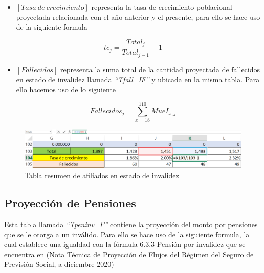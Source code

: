 \documentclass[
  letterpaper,
  DIV=11,
  numbers=noendperiod]{scrreprt}
\providecommand{\tightlist}{%
  \setlength{\itemsep}{0pt}\setlength{\parskip}{0pt}}\usepackage{longtable,booktabs,array}
\begin{document}
\begin{itemize}
\tightlist
\item
  \([Tasa\ de\ crecimiento]\) representa la tasa de crecimiento
  poblacional proyectada relacionada con el año anterior y el presente,
  para ello se hace uso de la siguiente formula
\end{itemize}

\begin{equation}
{tc}_j=\frac{{Total}_j}{{Total}_{j-1}}-1
\end{equation}

\begin{itemize}
\tightlist
\item
  \([Fallecidos]\) representa la suma total de la cantidad proyectada de
  fallecidos en estado de invalidez llamada \emph{``Tfall\_IF''} y
  ubicada en la misma tabla. Para ello hacemos uso de lo siguiente
\end{itemize}

\begin{equation}
{Fallecidos}_j=\sum_{x=18}^{110}{MueI}_{x,j}
\end{equation}

\begin{figure}

{\centering \includegraphics{images/F/Img35.png}

}

\caption{Tabla resumen de afiliados en estado de invalidez}

\end{figure}

\hypertarget{proyecciuxf3n-de-pensiones-1}{%
\subsection{Proyección de
Pensiones}\label{proyecciuxf3n-de-pensiones-1}}

Esta tabla llamada \emph{``Tpeninv\_F''} contiene la proyección del
monto por pensiones que se le otorga a un inválido. Para ello se hace
uso de la siguiente formula, la cual establece una igualdad con la
fórmula 6.3.3 Pensión por invalidez que se encuentra en (Nota Técnica de
Proyección de Flujos del Régimen del Seguro de Previsión Social, a
diciembre 2020)
\end{document}
